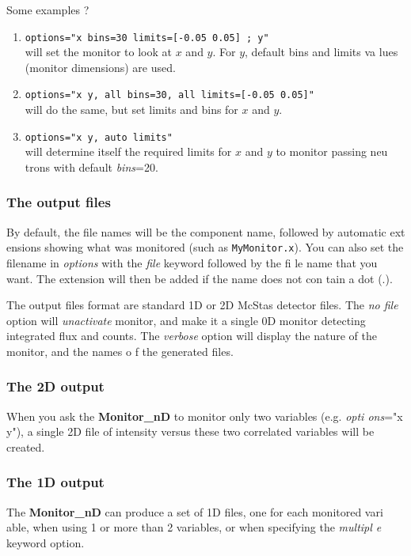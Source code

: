 \documentclass[12pt]{report}
\begin{document}
Some examples ?
\begin{enumerate}
\item{\texttt{options="x bins=30 limits=[-0.05 0.05] ; y"} \\
will set the monitor to look at $x$ and $y$. For $y$, default bins and limits va
lues (monitor dimensions) are used.}
\item{\texttt{options="x y, all bins=30, all limits=[-0.05 0.05]"} \\
will do the same, but set limits and bins for $x$ and $y$.}
\item{\texttt{options="x y, auto limits"} \\
will determine itself the required limits for $x$ and $y$ to monitor passing neu
trons with default {\it bins}=20.}
\end{enumerate}

\subsubsection{The output files}

By default, the file names will be the component name, followed by automatic ext
ensions showing what was monitored (such as \texttt{MyMonitor.x}). You can also 
set the filename in {\it options} with the {\it file} keyword followed by the fi
le name that you want. The extension will then be added if the name does not con
tain a dot (.).

The output files format are standard 1D or 2D McStas detector files.
The {\it no file} option will {\it unactivate} monitor, and make it a single 0D 
monitor detecting integrated flux and counts.
The {\it verbose} option will display the nature of the monitor, and the names o
f the generated files.

\subsubsection{The 2D output}

When you ask the {\bf Monitor\_nD} to monitor only two variables (e.g. {\it opti
ons}="x y"), a single 2D file of intensity versus these two correlated variables
 will be created.

\subsubsection{The 1D output}

The {\bf Monitor\_nD} can produce a set of 1D files, one for each monitored vari
able, when using 1 or more than 2 variables, or when specifying the {\it multipl
e} keyword option.
\end{document}

